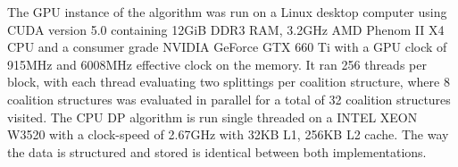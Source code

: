 \documentclass{llncs}
\newcommand{\boxplot}[2][]{
    \addplot [box plot median,#1] table {#2};
    \addplot [forget plot, box plot box,#1] table {#2};
    \addplot [forget plot, box plot top whisker,#1] table {#2};
    \addplot [forget plot, box plot bottom whisker,#1] table {#2};
}
\begin{document}
The GPU instance of the algorithm was run on a Linux desktop computer using CUDA version 5.0 containing 12GiB DDR3 RAM,  3.2GHz AMD Phenom II X4 CPU and a consumer grade NVIDIA GeForce GTX 660 Ti with a GPU clock of 915MHz and 6008MHz effective clock on the memory.
It ran 256 threads per block, with each thread evaluating two splittings per coalition structure, 
where 8 coalition structures was evaluated in parallel for a total of 32 coalition structures visited.
The CPU DP algorithm is run single threaded on a INTEL XEON W3520 with a clock-speed of 2.67GHz with 32KB L1, 256KB L2 cache.  The way the data is structured and stored is identical between both implementations.

%
\end{document}
